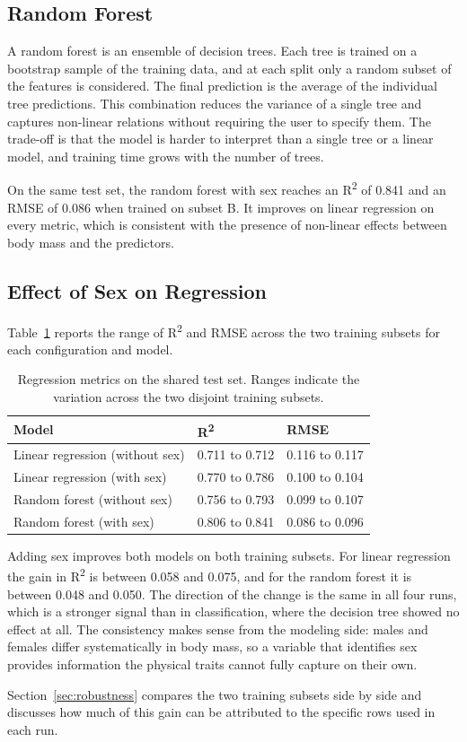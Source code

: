 \subsection{Random Forest}

A random forest is an ensemble of decision trees. Each tree is trained on a bootstrap sample of the training data, and at each split only a random subset of the features is considered. The final prediction is the average of the individual tree predictions. This combination reduces the variance of a single tree and captures non-linear relations without requiring the user to specify them. The trade-off is that the model is harder to interpret than a single tree or a linear model, and training time grows with the number of trees.

On the same test set, the random forest with sex reaches an R\textsuperscript{2} of 0.841 and an RMSE of 0.086 when trained on subset B. It improves on linear regression on every metric, which is consistent with the presence of non-linear effects between body mass and the predictors.

\subsection{Effect of Sex on Regression}

Table~\ref{tab:reg_metrics} reports the range of R\textsuperscript{2} and RMSE across the two training subsets for each configuration and model.

\begin{table}[htbp]
	\centering
	\caption{Regression metrics on the shared test set. Ranges indicate the variation across the two disjoint training subsets.}
	\label{tab:reg_metrics}
	\begin{tabular}{lll}
		\toprule
		Model & R\textsuperscript{2} & RMSE \\
		\midrule
		Linear regression (without sex) & 0.711 to 0.712 & 0.116 to 0.117 \\
		Linear regression (with sex)    & 0.770 to 0.786 & 0.100 to 0.104 \\
		Random forest (without sex)     & 0.756 to 0.793 & 0.099 to 0.107 \\
		Random forest (with sex)        & 0.806 to 0.841 & 0.086 to 0.096 \\
		\bottomrule
	\end{tabular}
\end{table}

Adding sex improves both models on both training subsets. For linear regression the gain in R\textsuperscript{2} is between 0.058 and 0.075, and for the random forest it is between 0.048 and 0.050. The direction of the change is the same in all four runs, which is a stronger signal than in classification, where the decision tree showed no effect at all. The consistency makes sense from the modeling side: males and females differ systematically in body mass, so a variable that identifies sex provides information the physical traits cannot fully capture on their own.

Section~\ref{sec:robustness} compares the two training subsets side by side and discusses how much of this gain can be attributed to the specific rows used in each run.